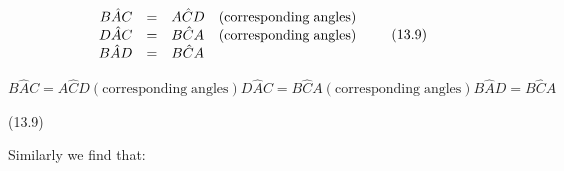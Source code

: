 {\begin{mdframed}[linewidth=4, leftmargin=40, rightmargin=40]
\begin{exercise}
\begin{enumerate}[noitemsep, label=\textbf{Step} \textbf{\arabic*}. ]
{    \begin{equation}
    \begin{array}{cccc}\hfill B\hat{A}C& =& A\hat{C}D\hfill & \left(\mathrm{corresponding\; angles}\right)\\ \hfill D\hat{A}C& =& B\hat{C}A\hfill & \left(\mathrm{corresponding\; angles}\right)\\ \hfill B\hat{A}D& =& B\hat{C}A\hfill & \end{array}\tag{13.9}
      \end{equation}
    }{%
    \setlength{\mymathboxwidth}{\columnwidth}
      \addtolength{\mymathboxwidth}{-48pt}
    \par\vspace{12pt}\noindent\begin{minipage}{\columnwidth}
    \parbox[t]{\mymathboxwidth}{\large\begin{math}
    B\hat{A}C=A\hat{C}D\left(\mathrm{corresponding\; angles}\right)D\hat{A}C=B\hat{C}A\left(\mathrm{corresponding\; angles}\right)B\hat{A}D=B\hat{C}A\end{math}}\hfill
    \parbox[t]{48pt}{\raggedleft 
    (13.9)}
    \end{minipage}\vspace{12pt}\par
    }%
Similarly we find that: 
\label{m39352*id97}\nopagebreak\noindent{}
\end{enumerate}
    \end{exercise}
    \end{mdframed}
    }
